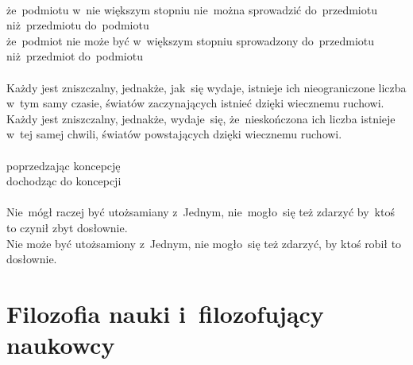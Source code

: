 \documentclass[a4paper,11pt]{article}
\begin{document}
\noindent
{} \\
\Jest  że~podmiotu w~nie większym stopniu nie~można sprowadzić
do~przedmiotu niż~przedmiotu do~podmiotu \\
\Powin że~podmiot nie może być w~większym stopniu sprowadzony
do~przedmiotu niż~przedmiot do~podmiotu \\
 \\
\Jest  Każdy jest zniszczalny, jednakże, jak~się wydaje, istnieje ich
nieograniczone liczba w~tym samy czasie, światów zaczynających istnieć
dzięki wiecznemu ruchowi. \\
\Powin Każdy jest zniszczalny, jednakże, wydaje~się, że~nieskończona ich
liczba istnieje w~tej samej chwili, światów powstających dzięki
wiecznemu ruchowi. \\
 \\
\Jest  poprzedzając koncepcję \\
\Powin dochodząc do koncepcji \\
 \\
\Jest  Nie~mógł raczej być utożsamiany z~Jednym, nie~mogło~się też
zdarzyć by~ktoś to czynił zbyt dosłownie. \\
\Powin Nie może być utożsamiony z~Jednym, nie mogło~się też zdarzyć, by
ktoś robił to dosłownie.













\newpage

\section{Filozofia nauki i~filozofujący naukowcy}

\vspace{\spaceTwo}




\vspace{0em}

\end{document}
